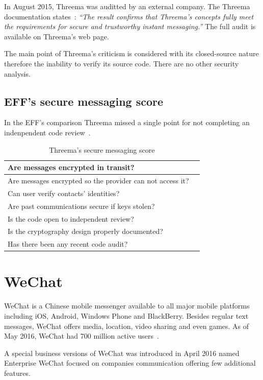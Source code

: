 \documentclass[thesis=M,english]{FITthesis}[2012/10/20]
\newcommand{\cmark}{\ding{51}}%
\newcommand{\xmark}{\ding{55}}%
\begin{document}
In August 2015, Threema was auditted by an external company. The Threema documentation states~\cite{threema-audit}: \emph{``The result confirms that Threema's concepts fully meet the requirements for secure and trustworthy instant messaging.''} The full audit is available on Threema's web page.

The main point of Threema's criticism is considered with its closed-source nature therefore the inability to verify its source code. There are no other security analysis.

\subsection{EFF's secure messaging score}

In the EFF's comparison Threema missed a single point for not completing an indenpendent code review~\cite{eff-score}.

\begin{table}[htb]
	\centering
	\caption{Threema's secure messaging score}
	\label{my-label}
	\begin{tabular}{|l|l|}
		\hline
		Are messages encrypted in transit? & \cmark \\\hline
		Are messages encrypted so the provider can not access it? & \cmark \\ \hline
		Can user verify contacts' identities? & \cmark \\ \hline
		Are past communications secure if keys stolen? & \cmark \\ \hline
		Is the code open to independent review? & \xmark \\ \hline
		Is the cryptography design properly documented? & \cmark \\ \hline
		Has there been any recent code audit? & \cmark \\ \hline
	\end{tabular}
\end{table}


\section{WeChat}

WeChat is a Chinese mobile messenger available to all major mobile platforms including iOS, Android, Windows Phone and BlackBerry. Besides regular text messages, WeChat offers media, location, video sharing and even games. As of May 2016, WeChat had 700 million active users~\cite{wechat-users}.

A special business versions of WeChat was introduced in April 2016 named Enterprise WeChat focused on companies communication offering few additional features.
\end{document}
